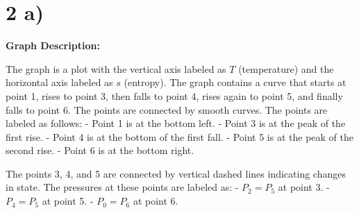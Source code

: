 \section*{2 a)}

\begin{center}
\textbf{Graph Description:}
\end{center}

The graph is a plot with the vertical axis labeled as $T$ (temperature) and the horizontal axis labeled as $s$ (entropy). The graph contains a curve that starts at point 1, rises to point 3, then falls to point 4, rises again to point 5, and finally falls to point 6. The points are connected by smooth curves. The points are labeled as follows:
- Point 1 is at the bottom left.
- Point 3 is at the peak of the first rise.
- Point 4 is at the bottom of the first fall.
- Point 5 is at the peak of the second rise.
- Point 6 is at the bottom right.

The points 3, 4, and 5 are connected by vertical dashed lines indicating changes in state. The pressures at these points are labeled as:
- $P_2 = P_5$ at point 3.
- $P_4 = P_5$ at point 5.
- $P_0 = P_6$ at point 6.